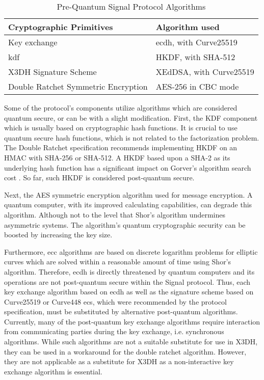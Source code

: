 \begin{table}[htbp]
	\centering
	\caption{Pre-Quantum Signal Protocol Algorithms}
	\label{tab:signal-alg}
	\begin{tabular}{!{\color{black}\vrule}l!{\color{black}\vrule}l!{\color{black}\vrule}} 
		\hline
			Cryptographic Primitives      & Algorithm used      \\ 
		\hline
		\hline
		Key exchange            & \acrshort{ecdh}, with Curve25519  \\ 
		\hline
		\gls{kdf}              & HKDF, with SHA-512    \\ 
		\hline
		X3DH Signature Scheme        & XEdDSA, with Curve25519 \\ 
		\hline
		Double Ratchet Symmetric Encryption & AES-256 in CBC mode   \\
		\hline
	\end{tabular}
\end{table}
Some of the protocol's components utilize algorithms which are considered quantum secure, or can be with a slight modification.
First, the KDF component which is usually based on cryptographic hash functions. It is crucial to use quantum secure hash functions, which is not related to the factorization problem. The Double Ratchet specification recommends implementing HKDF on an HMAC with SHA-256 or SHA-512. A HKDF based upon a SHA-2 as its underlying hash function has a significant impact on Gorver's algorithm search cost \cite{bogomolec2019towards}. So far, such HKDF is considered post-quantum secure.
\par
Next, the AES symmetric encryption algorithm used for message encryption. A quantum computer, with its improved calculating capabilities, can degrade this algorithm. Although not to the level that Shor's algorithm undermines asymmetric systems. The algorithm's quantum cryptographic security can be boosted by increasing the key size.
\par
Furthermore, \gls{ecc} algorithms are based on discrete logarithm problems for elliptic curves which are solved within a reasonable amount of time using Shor’s algorithm. Therefore, \gls{ecdh} is directly threatened by quantum computers and its operations are not post-quantum secure within the Signal protocol. Thus, each key exchange algorithm based on \gls{ecdh} as well as the signature scheme based on Curve25519 or Curve448 \glspl{ec}, which were recommended by the protocol specification, must be substituted by alternative post-quantum algorithms. 
Currently, many of the post-quantum key exchange algorithms require interaction from communicating parties during the key exchange, i.e. synchronous algorithms. While such algorithms are not a suitable substitute for use in X3DH, they can be used in a workaround for the double ratchet algorithm. However, they are not applicable as a substitute for X3DH as a non-interactive key exchange algorithm is essential.
